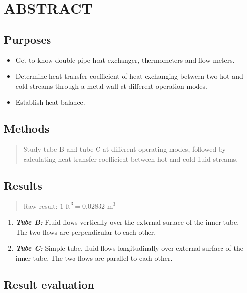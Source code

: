 \section{ABSTRACT}\label{abstract}

\subsection{Purposes}\label{purposes}

\begin{itemize}
    \item Get to know double-pipe heat exchanger, thermometers and flow meters.
    \item Determine heat transfer coefficient of heat exchanging between two hot and cold streams through a metal wall at different operation modes.
    \item Establish heat balance.
\end{itemize}

\subsection{Methods}\label{methods}

\begin{quote}
    Study tube B and tube C at different operating modes, followed by calculating heat transfer coefficient between hot and cold fluid streams.
\end{quote}

\subsection{Results}\label{results}

\begin{quote}
    Raw result: $1 \text{ ft}^3 = 0.02832 \text{ m}^3$
\end{quote}

\begin{enumerate}
    \item \emph{\textbf{Tube B:}} Fluid flows vertically over the external surface of the inner tube. The two flows are perpendicular to each other.
    \item \emph{\textbf{Tube C:}} Simple tube, fluid flows longitudinally over external surface of the inner tube. The two flows are parallel to each other.

\end{enumerate}

\subsection{Result evaluation}\label{result-evaluation}

